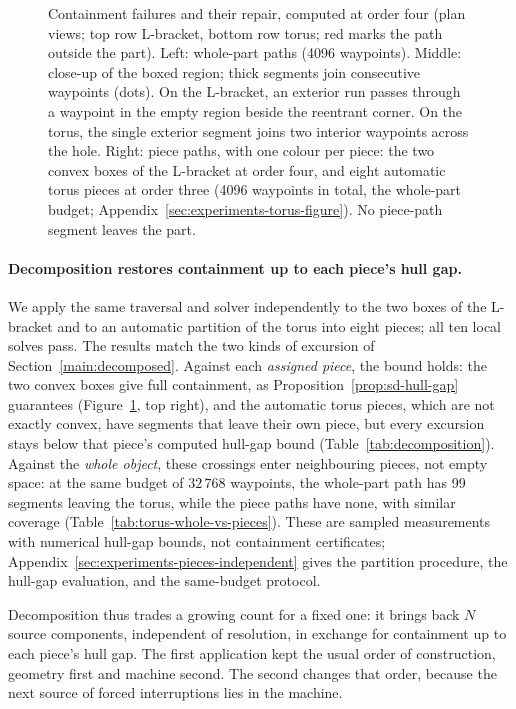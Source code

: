 \begin{figure}[tb]
  \centering
  \caption{Containment failures and their repair, computed at order four (plan views; top row L-bracket, bottom row torus; red marks the path outside the part). Left: whole-part paths (4096 waypoints). Middle: close-up of the boxed region; thick segments join consecutive waypoints (dots). On the L-bracket, an exterior run passes through a waypoint in the empty region beside the reentrant corner. On the torus, the single exterior segment joins two interior waypoints across the hole. Right: piece paths, with one colour per piece: the two convex boxes of the L-bracket at order four, and eight automatic torus pieces at order three (4096 waypoints in total, the whole-part budget; Appendix~\ref{sec:experiments-torus-figure}). No piece-path segment leaves the part.}
  \label{fig:containment-repair}
\end{figure}

\paragraph{Decomposition restores containment up to each piece's hull gap.}
We apply the same traversal and solver independently to the two boxes of the L-bracket and to an automatic partition of the torus into eight pieces; all ten local solves pass. The results match the two kinds of excursion of Section~\ref{main:decomposed}. Against each \emph{assigned piece}, the bound holds: the two convex boxes give full containment, as Proposition~\ref{prop:sd-hull-gap} guarantees (Figure~\ref{fig:containment-repair}, top right), and the automatic torus pieces, which are not exactly convex, have segments that leave their own piece, but every excursion stays below that piece's computed hull-gap bound (Table~\ref{tab:decomposition}). Against the \emph{whole object}, these crossings enter neighbouring pieces, not empty space: at the same budget of $32\,768$ waypoints, the whole-part path has 99 segments leaving the torus, while the piece paths have none, with similar coverage (Table~\ref{tab:torus-whole-vs-pieces}). These are sampled measurements with numerical hull-gap bounds, not containment certificates; Appendix~\ref{sec:experiments-pieces-independent} gives the partition procedure, the hull-gap evaluation, and the same-budget protocol.



Decomposition thus trades a growing count for a fixed one: it brings back $N$ source components, independent of resolution, in exchange for containment up to each piece's hull gap. The first application kept the usual order of construction, geometry first and machine second. The second changes that order, because the next source of forced interruptions lies in the machine.
\FloatBarrier
